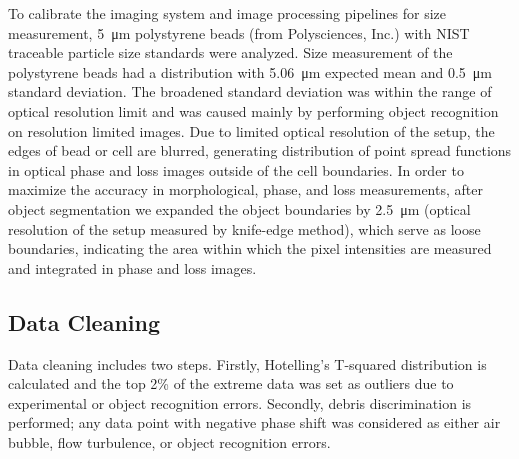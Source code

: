 \documentclass[aps,pra,reprint,superscriptaddress]{revtex4-1}
\begin{document}
To calibrate the imaging system and image processing pipelines for size measurement, \SI{5}{\micro\meter} polystyrene beads (from Polysciences, Inc.) with NIST traceable particle size standards were analyzed. Size measurement of the polystyrene beads had a distribution with \SI{5.06}{\micro\meter} expected mean and \SI{0.5}{\micro\meter} standard deviation. The broadened standard deviation was within the range of optical resolution limit and was caused mainly by performing object recognition on resolution limited images. Due to limited optical resolution of the setup, the edges of bead or cell are blurred, generating distribution of point spread functions in optical phase and loss images outside of the cell boundaries. In order to maximize the accuracy in morphological, phase, and loss measurements, after object segmentation we expanded the object boundaries by \SI{2.5}{\micro\meter} (optical resolution of the setup measured by knife-edge method), which serve as loose boundaries, indicating the area within which the pixel intensities are measured and integrated in phase and loss images.

\subsection*{Data Cleaning}

Data cleaning includes two steps. Firstly, Hotelling's T-squared distribution is calculated and the top 2\% of the extreme data was set as outliers due to experimental or object recognition errors. Secondly, debris discrimination is performed; any data point with negative phase shift was considered as either air bubble, flow turbulence, or object recognition errors.


\end{document}
